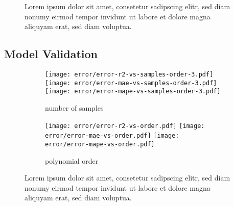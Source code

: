 \begin{figure}
    \noindent{}
    \caption{Lorem ipsum dolor sit amet, consetetur sadipscing elitr, sed diam nonumy eirmod tempor invidunt ut labore et dolore magna aliquyam erat, sed diam voluptua.}
\end{figure}

\subsection{Model Validation}


\begin{figure}

    \begin{subfigure}[t]{\textwidth}
        \caption{number of samples}
        \texttt{[image: error/error-r2-vs-samples-order-3.pdf]}
        \texttt{[image: error/error-mae-vs-samples-order-3.pdf]}
        \texttt{[image: error/error-mape-vs-samples-order-3.pdf]}
    \end{subfigure}
    \begin{subfigure}[t]{\textwidth}
        \caption{polynomial order}
        \texttt{[image: error/error-r2-vs-order.pdf]}
        \texttt{[image: error/error-mae-vs-order.pdf]}
        \texttt{[image: error/error-mape-vs-order.pdf]}
    \end{subfigure}
    \caption{Lorem ipsum dolor sit amet, consetetur sadipscing elitr, sed diam nonumy eirmod tempor invidunt ut labore et dolore magna aliquyam erat, sed diam voluptua.}
\end{figure}

